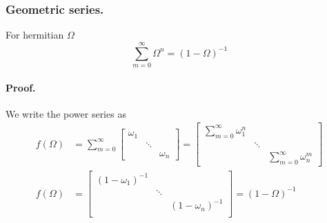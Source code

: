 \documentclass[../main.tex]{subfiles}
\begin{document}
\subsubsection{Geometric series.}
For hermitian $\Omega$
\begin{equation*}
	\sum_{m=0}^{\infty}\Omega^n=(1-\Omega)^{-1}
\end{equation*}

\paragraph*{Proof.}
We write the power series as
\begin{align*}
	f(\Omega) & =\sum_{m=0}^{\infty}
	\begin{bmatrix}
		\omega_1 &        &          \\
		         & \ddots &          \\
		         &        & \omega_n
	\end{bmatrix}
	=
	\begin{bmatrix}
		\sum_{m=0}^{\infty}\omega_1^n &        &                               \\
		                              & \ddots &                               \\
		                              &        & \sum_{m=0}^{\infty}\omega_n^m
	\end{bmatrix} \\
	f(\Omega) & =
	\begin{bmatrix}
		(1-\omega_1)^{-1} &        &                   \\
		                  & \ddots &                   \\
		                  &        & (1-\omega_n)^{-1} \\
	\end{bmatrix}
	=(1-\Omega)^{-1}
\end{align*}
\end{document}
